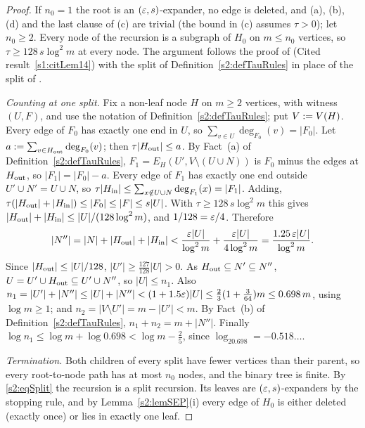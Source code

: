 \begin{proof}
If $n_0=1$ the root is an $(\varepsilon,s)$-expander, no edge is deleted, and (a), (b),
(d) and the last clause of (c) are trivial (the bound in (c) assumes $\tau>0$);
let $n_0\ge2$. Every node of the recursion is a subgraph of $H_0$ on $m\le n_0$
vertices, so $\tau\ge128\,s\log^2m$ at every node. The argument follows the
proof of \cite[Lemma~14]{BM} (Cited result~\ref{s1:citLem14}) with the split
of Definition~\ref{s2:defTauRules} in place of the split of \cite{BM}.

\emph{Counting at one split.} Fix a non-leaf node $H$ on $m\ge2$ vertices,
with witness $(U,F)$, and use the notation of
Definition~\ref{s2:defTauRules}; put $V\mathrel{:=} V(H)$. Every edge of $F_0$ has
exactly one end in $U$, so $\sum_{v\in U}\deg_{F_0}(v)=|F_0|$. Let
$a\mathrel{:=}\sum_{v\in H_{\mathrm{out}}}\deg_{F_0}(v)$; then $\tau|H_{\mathrm{out}}|\le a$. By Fact~(a) of
Definition~\ref{s2:defTauRules},
$F_1=E_H(U',V\setminus(U\cup N))$ is $F_0$ minus the edges at $H_{\mathrm{out}}$, so
$|F_1|=|F_0|-a$. Every edge of $F_1$ has exactly one end outside $U'\cup
N'=U\cup N$, so $\tau|H_{\mathrm{in}}|\le\sum_{x\notin U\cup N}\deg_{F_1}(x)=|F_1|$.
Adding, $\tau(|H_{\mathrm{out}}|+|H_{\mathrm{in}}|)\le|F_0|\le|F|\le s|U|$. With
$\tau\ge128\,s\log^2m$ this gives $|H_{\mathrm{out}}|+|H_{\mathrm{in}}|\le|U|/(128\log^2m)$, and
$1/128=\varepsilon/4$. Therefore
\[
|N''|=|N|+|H_{\mathrm{out}}|+|H_{\mathrm{in}}|<\frac{\varepsilon|U|}{\log^2m}+\frac{\varepsilon|U|}{4\log^2m}
=\frac{1.25\,\varepsilon|U|}{\log^2m}.
\]
Since $|H_{\mathrm{out}}|\le|U|/128$, $|U'|\ge\frac{127}{128}|U|>0$. As
$H_{\mathrm{out}}\subseteq N'\subseteq N''$, $U=U'\cup H_{\mathrm{out}}\subseteq U'\cup N''$, so
$|U|\le n_1$. Also $n_1=|U'|+|N''|\le|U|+|N''|<(1+1.5\varepsilon)|U|\le
\frac23(1+\frac{3}{64})m\le0.698\,m$, using $\log m\ge1$; and $n_2=|V\setminus
U'|=m-|U'|<m$. By Fact~(b) of Definition~\ref{s2:defTauRules},
$n_1+n_2=m+|N''|$. Finally $\log n_1\le\log m+\log0.698<\log m-\frac25$, since
$\log_20.698=-0.518\ldots$.

\emph{Termination.} Both children of every split have fewer vertices than
their parent, so every root-to-node path has at most $n_0$ nodes, and the
binary tree is finite. By \eqref{s2:eqSplit} the recursion is a split
recursion. Its leaves are $(\varepsilon,s)$-expanders by the stopping rule, and by
Lemma~\ref{s2:lemSEP}(i) every edge of $H_0$ is either deleted (exactly once)
or lies in exactly one leaf.


\end{proof}
